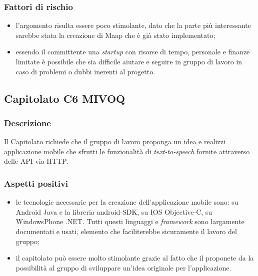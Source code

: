 \documentclass[12pt,a4paper]{article}
\begin{document}
\subsubsection{Fattori di rischio}
\begin{itemize}
\item l'argomento risulta essere poco stimolante, dato che la parte più interessante sarebbe stata la creazione di Maap che è già stato implementato;

\item essendo il committente una \textit{startup} con risorse di tempo, personale e finanze limitate è possibile che sia difficile aiutare e seguire in gruppo di lavoro in caso di problemi o dubbi inerenti al progetto.
\end{itemize}

\newpage
\subsection{Capitolato C6 MIVOQ}
\subsubsection{Descrizione}

Il Capitolato richiede che il gruppo di lavoro proponga un idea e realizzi applicazione mobile che sfrutti le funzionalità di \textit{text-to-speech} fornite attraverso delle API via HTTP.

\subsubsection{Aspetti positivi}
\begin{itemize}
 \item le tecnologie necessarie per la creazione dell'applicazione mobile sono: su Android Java e la libreria android-SDK, su IOS Objective-C, su WindowsPhone .NET. Tutti questi linguaggi e \textit{framework} sono largamente documentati e usati, elemento che faciliterebbe sicuramente il lavoro del gruppo;
 \item il capitolato può essere molto stimolante grazie al fatto che il proponete da la possibilità al gruppo di sviluppare un'idea originale per l'applicazione. 
\end{itemize}
\end{document}
